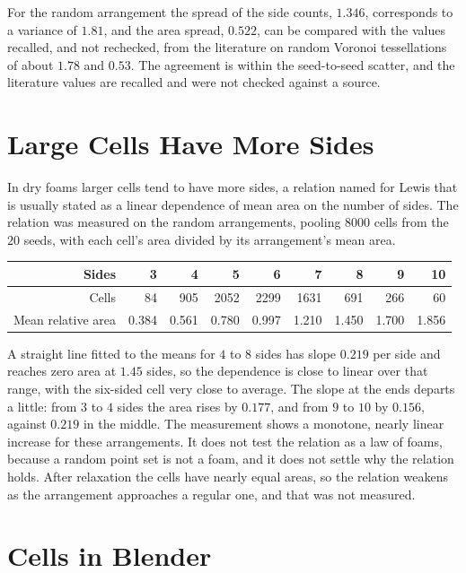 For the random arrangement the spread of the side counts, $1.346$, corresponds to a variance of $1.81$, and the area spread, $0.522$, can be compared with the values recalled, and not rechecked, from the literature on random Voronoi tessellations of about $1.78$ and $0.53$. The agreement is within the seed-to-seed scatter, and the literature values are recalled and were not checked against a source.

\section{Large Cells Have More Sides}

In dry foams larger cells tend to have more sides, a relation named for Lewis that is usually stated as a linear dependence of mean area on the number of sides. The relation was measured on the random arrangements, pooling $8000$ cells from the $20$ seeds, with each cell's area divided by its arrangement's mean area.

\begin{center}
\begin{tabular}{rrrrrrrrr}
\toprule
Sides & 3 & 4 & 5 & 6 & 7 & 8 & 9 & 10\\
\midrule
Cells & 84 & 905 & 2052 & 2299 & 1631 & 691 & 266 & 60\\
Mean relative area & 0.384 & 0.561 & 0.780 & 0.997 & 1.210 & 1.450 & 1.700 & 1.856\\
\bottomrule
\end{tabular}
\end{center}

A straight line fitted to the means for $4$ to $8$ sides has slope $0.219$ per side and reaches zero area at $1.45$ sides, so the dependence is close to linear over that range, with the six-sided cell very close to average. The slope at the ends departs a little: from $3$ to $4$ sides the area rises by $0.177$, and from $9$ to $10$ by $0.156$, against $0.219$ in the middle. The measurement shows a monotone, nearly linear increase for these arrangements. It does not test the relation as a law of foams, because a random point set is not a foam, and it does not settle why the relation holds. After relaxation the cells have nearly equal areas, so the relation weakens as the arrangement approaches a regular one, and that was not measured.

\section{Cells in Blender}

